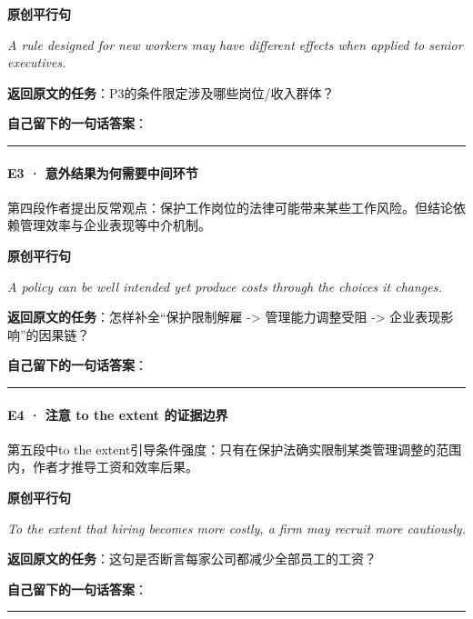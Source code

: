 \documentclass[
  11pt,
]{ctexart}
\renewenvironment{quote}{\begin{tcolorbox}[enhanced,breakable,colback=sand,colframe=primary!22,boxrule=0.4pt,arc=2pt,left=2.6mm,right=2.6mm,top=1.6mm,bottom=1.6mm]\itshape}{\end{tcolorbox}}
\begin{document}
\textbf{原创平行句}

\begin{quote}
A rule designed for new workers may have different effects when applied
to senior executives.
\end{quote}

\textbf{返回原文的任务}：P3的条件限定涉及哪些岗位/收入群体？

\textbf{自己留下的一句话答案}：

\rule{0.75\linewidth}{0.35pt}

\paragraph{E3 ·
意外结果为何需要中间环节}\label{e3-ux610fux5916ux7ed3ux679cux4e3aux4f55ux9700ux8981ux4e2dux95f4ux73afux8282}

第四段作者提出反常观点：保护工作岗位的法律可能带来某些工作风险。但结论依赖管理效率与企业表现等中介机制。

\textbf{原创平行句}

\begin{quote}
A policy can be well intended yet produce costs through the choices it
changes.
\end{quote}

\textbf{返回原文的任务}：怎样补全``保护限制解雇 -\textgreater{}
管理能力调整受阻 -\textgreater{} 企业表现影响''的因果链？

\textbf{自己留下的一句话答案}：

\rule{0.75\linewidth}{0.35pt}

\paragraph{E4 · 注意 to the extent
的证据边界}\label{e4-ux6ce8ux610f-to-the-extent-ux7684ux8bc1ux636eux8fb9ux754c}

第五段中to the
extent引导条件强度：只有在保护法确实限制某类管理调整的范围内，作者才推导工资和效率后果。

\textbf{原创平行句}

\begin{quote}
To the extent that hiring becomes more costly, a firm may recruit more
cautiously.
\end{quote}

\textbf{返回原文的任务}：这句是否断言每家公司都减少全部员工的工资？

\textbf{自己留下的一句话答案}：

\rule{0.75\linewidth}{0.35pt}
\end{document}
